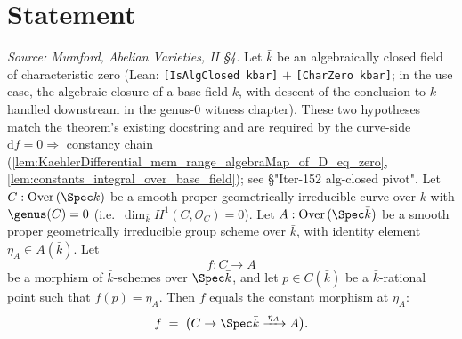 \section{Statement}

\begin{theorem}
  \label{thm:rigidity_over_kbar}
  \leanok
  \textit{Source: Mumford, Abelian Varieties, II §4.}
  Let \(\bar k\) be an algebraically closed field of characteristic zero (Lean: \texttt{[IsAlgClosed kbar]} \(+\) \texttt{[CharZero kbar]}; in the use case, the algebraic closure of a base field \(k\), with descent of the conclusion to \(k\) handled downstream in the genus-\(0\) witness chapter). These two hypotheses match the theorem's existing docstring and are required by the curve-side \(\mathrm df = 0 \Rightarrow\) constancy chain (\cref{lem:KaehlerDifferential_mem_range_algebraMap_of_D_eq_zero}, \cref{lem:constants_integral_over_base_field}); see \S "Iter-152 alg-closed pivot". Let \(C : \mathrm{Over}\,(\Spec \bar k)\) be a smooth proper geometrically irreducible curve over \(\bar k\) with \(\genus(C) = 0\) (i.e.\ \(\dim_{\bar k} H^1(C, \mathcal O_C) = 0\)). Let \(A : \mathrm{Over}\,(\Spec \bar k)\) be a smooth proper geometrically irreducible group scheme over \(\bar k\), with identity element \(\eta_A \in A(\bar k)\). Let
  \[
    f \colon C \longrightarrow A
  \]
  be a morphism of \(\bar k\)-schemes over \(\Spec \bar k\), and let \(p \in C(\bar k)\) be a \(\bar k\)-rational point such that \(f(p) = \eta_A\). Then \(f\) equals the constant morphism at \(\eta_A\):
  \[
    f \;=\; \bigl(C \to \Spec \bar k \xrightarrow{\,\eta_A\,} A\bigr).
  \]


\end{theorem}
